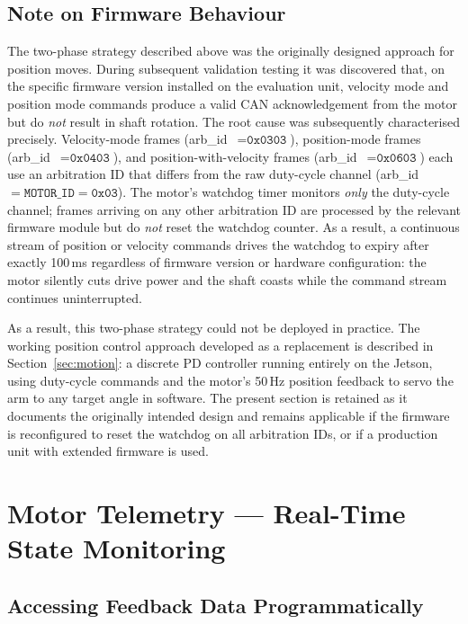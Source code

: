 \documentclass[12pt,a4paper]{article}
\begin{document}
\subsection{Note on Firmware Behaviour}

The two-phase strategy described above was the originally designed approach
for position moves.  During subsequent validation testing it was discovered
that, on the specific firmware version installed on the evaluation unit,
velocity mode and position mode commands produce a valid CAN acknowledgement
from the motor but do \emph{not} result in shaft rotation.  The root cause was subsequently characterised precisely.
Velocity-mode frames (arb\_id~$= \texttt{0x0303}$),
position-mode frames (arb\_id~$= \texttt{0x0403}$), and
position-with-velocity frames (arb\_id~$= \texttt{0x0603}$) each use
an arbitration ID that differs from the raw duty-cycle channel
(arb\_id~$= \texttt{MOTOR\_ID} = \texttt{0x03}$). The motor's
watchdog timer monitors \emph{only} the duty-cycle channel; frames
arriving on any other arbitration ID are processed by the relevant
firmware module but do \emph{not} reset the watchdog counter.
As a result, a continuous stream of position or velocity commands
drives the watchdog to expiry after exactly 100\,ms regardless of
firmware version or hardware configuration: the motor silently cuts
drive power and the shaft coasts while the command stream continues
uninterrupted.

As a result, this two-phase strategy could not be deployed in practice.
The working position control approach developed as a replacement is
described in Section~\ref{sec:motion}: a discrete PD controller running
entirely on the Jetson, using duty-cycle commands and the motor's 50\,Hz
position feedback to servo the arm to any target angle in software.
The present section is retained as it documents the originally intended
design and remains applicable if the firmware is reconfigured to reset
the watchdog on all arbitration IDs, or if a production unit with
extended firmware is used.

\section{Motor Telemetry --- Real-Time State Monitoring}
\label{sec:telemetry}

\subsection{Accessing Feedback Data Programmatically}
\end{document}

